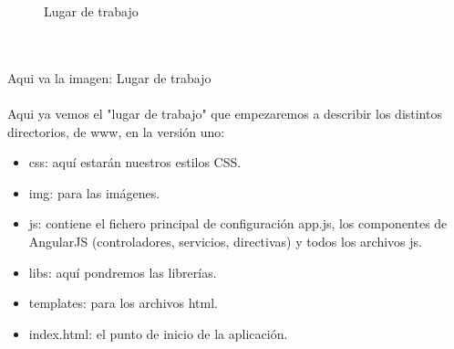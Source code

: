 \documentclass[a4paper, 11pt]{article}
\begin{document}
\begin{itemize}
             \begin{figure}[H]
               \centering
                    \caption{Lugar de trabajo}
                    \label{f:estructuraTrabajo}
              \end{figure}

            \\\\\textcolor[rgb]{1,0,0}{Aqui va la imagen: Lugar de trabajo}\\\\

            Aqui ya vemos el "lugar de trabajo" que empezaremos a describir los
            distintos directorios, de www, en la versión uno:

            \begin{itemize}
                  \item{css: aquí estarán nuestros estilos CSS.}
                  \item{img: para las imágenes.}
                  \item{js: contiene el fichero principal de configuración app.js,
                        los componentes de AngularJS (controladores, servicios,
                        directivas) y todos los archivos js.}
                  \item{libs: aquí pondremos las librerías.}
                  \item{templates: para los archivos html.}
                  \item{index.html: el punto de inicio de la aplicación.}
            \end{itemize}


\end{itemize}
\end{document}
